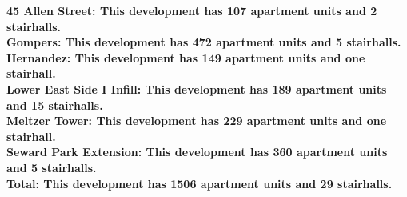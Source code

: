 \bf{45 Allen Street}: This development has 107 apartment units and 2 stairhalls.\\\bf{Gompers}: This development has 472 apartment units and 5 stairhalls.\\\bf{Hernandez}: This development has 149 apartment units and one stairhall.\\\bf{Lower East Side I Infill}: This development has 189 apartment units and 15 stairhalls.\\\bf{Meltzer Tower}: This development has 229 apartment units and one stairhall.\\\bf{Seward Park Extension}: This development has 360 apartment units and 5 stairhalls.\\\bf{Total}: This development has 1506 apartment units and 29 stairhalls.\\